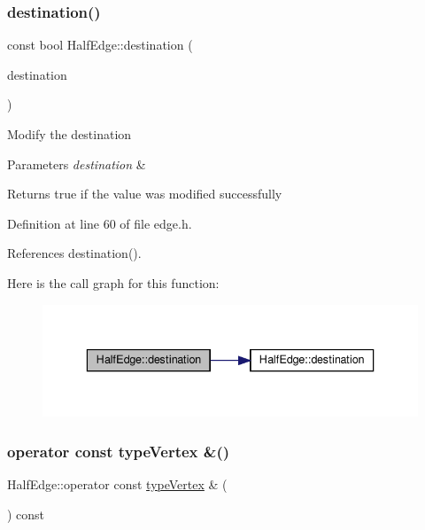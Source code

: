 \subsubsection{\texorpdfstring{destination()}{destination()}\hspace{0.1cm}{\footnotesize\ttfamily [2/2]}}
{\footnotesize\ttfamily const bool Half\+Edge\+::destination (\begin{DoxyParamCaption}\item[{const \hyperlink{edge_8h_a5fbd20c46956d479cb10afc9855223f6}{type\+Vertex} \&}]{destination }\end{DoxyParamCaption})\hspace{0.3cm}{\ttfamily [inline]}}

Modify the destination 
\begin{DoxyParams}{Parameters}
{\em destination} & \\
\hline
\end{DoxyParams}
\begin{DoxyReturn}{Returns}
true if the value was modified successfully 
\end{DoxyReturn}


Definition at line 60 of file edge.\+h.



References destination().

Here is the call graph for this function\+:
\nopagebreak
\begin{figure}[H]
\begin{center}
\leavevmode
\includegraphics[width=336pt]{classHalfEdge_ac9f0f75077407355bde248e083d98161_cgraph}
\end{center}
\end{figure}
\mbox{\label{classHalfEdge_a68ec8852ea749e21798e7d65deff483e}} 
\subsubsection{\texorpdfstring{operator const type\+Vertex \&()}{operator const typeVertex \&()}}
{\footnotesize\ttfamily Half\+Edge\+::operator const \hyperlink{edge_8h_a5fbd20c46956d479cb10afc9855223f6}{type\+Vertex} \& (\begin{DoxyParamCaption}{ }\end{DoxyParamCaption}) const\hspace{0.3cm}{\ttfamily [inline]}}

